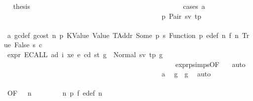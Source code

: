 \begin{isabellebody}
\ \isamarkupfalse%
\ {\isacharquery}{\kern0pt}thesis\isanewline
\ \ \ \ \ \ \ \ \ \ \ \ \ \ \ \ \ \ \ \ \ \ \ \ \ \ \ \ \ \ \ \ \ \ \ \ \ \ \ \ \ \ \isamarkupfalse%
\ {\isacharparenleft}{\kern0pt}cases\ a{\isacharparenright}{\kern0pt}\isanewline
\ \ \ \ \ \ \ \ \ \ \ \ \ \ \ \ \ \ \ \ \ \ \ \ \ \ \ \ \ \ \ \ \ \ \ \ \ \ \ \ \ \ \ \ \isamarkupfalse%
\ p{}{\isacharcolon}{\kern0pt}\ {\isacharparenleft}{\kern0pt}Pair\ sv\ tp{\isacharparenright}{\kern0pt}\isanewline
\ \ \ \ \ \ \ \ \ \ \ \ \ \ \ \ \ \ \ \ \ \ \ \ \ \ \ \ \ \ \ \ \ \ \ \ \ \ \ \ \ \ \ \ \isamarkupfalse%
\ a{}\ gc{\isacharunderscore}{\kern0pt}def\ gcost\ n\ p{}\ KValue\ Value\ TAddr\ Some\ p{}\ s{}\ Function\ p{}\ e{\isacharprime}{\kern0pt}{\isacharunderscore}{\kern0pt}def\ n{}\ f{}\ n{}\ True\ False\ s{}\ c\isanewline
\ \ \ \ \ \ \ \ \ \ \ \ \ \ \ \ \ \ \ \ \ \ \ \ \ \ \ \ \ \ \ \ \ \ \ \ \ \ \ \ \ \ \ \ \isamarkupfalse%
\ {\isachardoublequoteopen}expr\ {\isacharparenleft}{\kern0pt}ECALL\ ad\ i\ xe{\isacharparenright}{\kern0pt}\ e\ cd\ st\ g\ {\isacharequal}{\kern0pt}\ Normal\ {\isacharparenleft}{\kern0pt}{\isacharparenleft}{\kern0pt}sv{\isacharcomma}{\kern0pt}\ tp{\isacharparenright}{\kern0pt}{\isacharcomma}{\kern0pt}\ g{\isacharprime}{\kern0pt}{\isacharprime}{\kern0pt}{\isacharprime}{\kern0pt}{\isacharparenright}{\kern0pt}{\isachardoublequoteclose}\isanewline
\ \ \ \ \ \ \ \ \ \ \ \ \ \ \ \ \ \ \ \ \ \ \ \ \ \ \ \ \ \ \ \ \ \ \ \ \ \ \ \ \ \ \ \ \ \ \ \ \isamarkupfalse%
\ expr{\isachardot}{\kern0pt}psimps{\isacharparenleft}{\kern0pt}{}{}{\isacharparenright}{\kern0pt}{\isacharbrackleft}{\kern0pt}OF\ {}{}{\isacharparenleft}{\kern0pt}{}{\isacharparenright}{\kern0pt}{\isacharbrackright}{\kern0pt}\ \isamarkupfalse%
\ auto\isanewline
\ \ \ \ \ \ \ \ \ \ \ \ \ \ \ \ \ \ \ \ \ \ \ \ \ \ \ \ \ \ \ \ \ \ \ \ \ \ \ \ \ \ \ \ \isamarkupfalse%
\ a{}\ \isamarkupfalse%
\ {\isachardoublequoteopen}g{}{\isacharprime}{\kern0pt}\ {\isasymle}\ g{\isacharprime}{\kern0pt}{\isacharprime}{\kern0pt}{\isacharprime}{\kern0pt}{\isachardoublequoteclose}\ \isamarkupfalse%
\ auto\isanewline
\ \ \ \ \ \ \ \ \ \ \ \ \ \ \ \ \ \ \ \ \ \ \ \ \ \ \ \ \ \ \ \ \ \ \ \ \ \ \ \ \ \ \ \ \isamarkupfalse%
\ \isamarkupfalse%
\ {}{}{\isacharparenleft}{\kern0pt}{}{\isacharparenright}{\kern0pt}{\isacharbrackleft}{\kern0pt}OF\ {\isacharasterisk}{\kern0pt}\ {\isacharasterisk}{\kern0pt}{\isacharasterisk}{\kern0pt}\ n\ {}\ {}\ {}\ {}\ {\isacharunderscore}{\kern0pt}\ {}\ {\isacharunderscore}{\kern0pt}\ {\isacharunderscore}{\kern0pt}\ n{}{\isacharbrackright}{\kern0pt}\ p{}\ f{}\ e{\isacharprime}{\kern0pt}{\isacharunderscore}{\kern0pt}def\ n{}\isanewline

\end{isabellebody}
